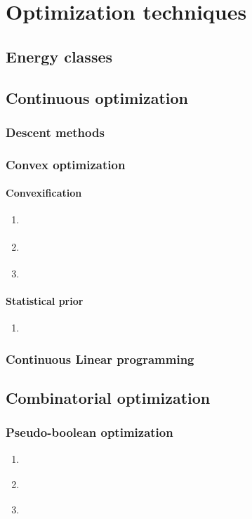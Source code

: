 \chapter{Optimization techniques}

\section{Energy classes}		
\section{Continuous optimization}
	\subsection{Descent methods}			
	
	\subsection{Convex optimization}	

	\subsubsection{Convexification}
		\begin{enumerate}
			\item{ \cite{ambrosio90} }
			\item{ \cite{strekalovskiy12} }
			\item{ \cite{grady09} }
		\end{enumerate}
	
	\subsubsection{Statistical prior}
		\begin{enumerate}
			\item{ \cite{brox07} }
		\end{enumerate}
		
	\subsection{Continuous Linear programming}			

\section{Combinatorial optimization}	

\subsection{Pseudo-boolean optimization}
	\begin{enumerate}
		\item{ \cite{rother07} }
		\item{ \cite{boros02} }		
		\item{ \cite{hammer84} }
	\end{enumerate}
	
